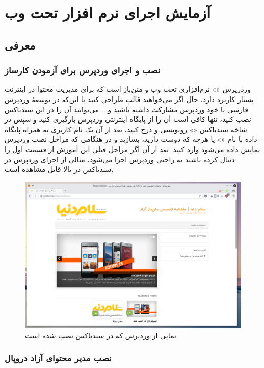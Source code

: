 \part*{آزمایش اجرای نرم افزار تحت وب }
\chapter*{معرفی}
\section{نصب و اجرای وردپرس 
      برای آزمودن کارساز}
 وردرپرس «» نرم‌افزاری تحت وب و متن‌باز است که برای مدیریت محتوا در اینترنت بسیار کاربرد دارد، حال اگر می‌خواهید قالب طراحی کنید یا این‌که در توسعهٔ وردپرس فارسی یا خود وردپرس مشارکت داشته باشید و .. می‌توانید آن را در این سندباکس نصب کنید، تنها کافی است آن را از پایگاه اینترنتی وردپرس  بارگیری کنید و سپس در شاخهٔ سندباکس «» رونویسی و درج کنید، بعد از آن یک نام کاربری به همراه پایگاه داده با نام «»  یا هرچه که دوست دارید، بسازید و در هنگامی که مراحل نصب وردپرس نمایش داده می‌شود وارد کنید. بعد از آن اگر مراحل قبلی این آموزش از قسمت اول را دنبال کرده باشید به راحتی وردپرس اجرا می‌شود، مثالی از اجرای وردپرس در سندباکس در بالا قابل مشاهده است.
\begin{figure}
    \includegraphics[width=.9\textwidth ,height=.50\textwidth]{Pic/WP-SANDBOX}
    \caption{ نمایی از وردپرس که در سندباکس نصب شده است
        \lr{}   
    }
    \label{WP-SANDBOX}
\end{figure}

\section{نصب مدیر محتوای آزاد دروپال}

